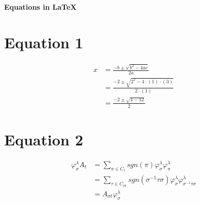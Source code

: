 \documentclass[10pt, a4paper]{article}
\begin{document}
\begin{center}
\textbf{\large Equations in \LaTeX}
\end{center}
\vspace{2cm}
\begin{minipage}{0.48 \textwidth}
\section*{Equation 1}
\begin{align*}
x &= \frac{-b \pm \sqrt{b^{2} - 4ac}}{2a}\\ 
&= \frac{-2 \pm \sqrt{2^{2} - 4 \cdot (1) \cdot (3)}}{2 \cdot (1)}\\
&= \frac{-2 \pm \sqrt{4 - 12}}{2}
\end{align*}
\end{minipage}
\begin{minipage}{0.48 \textwidth}
\section*{Equation 2}
\begin{align*}
\varphi^{\lambda}_{\sigma} A_{t} &= \sum_{\pi \in C_{t}} sgn (\pi) \varphi^{\lambda}_{\sigma} \varphi^{\lambda}_{\pi}\\
&= \sum_{\tau \in C_{\sigma t}} sgn(\sigma^{-1} \tau \sigma) \varphi^{\lambda}_{\sigma} \varphi^{\lambda}_{\sigma^{-1} \tau \sigma}\\
&= A_{\sigma t} \varphi^{\lambda}_{\sigma}
\end{align*}
\end{minipage}
\vspace{3cm}
\end{document}
